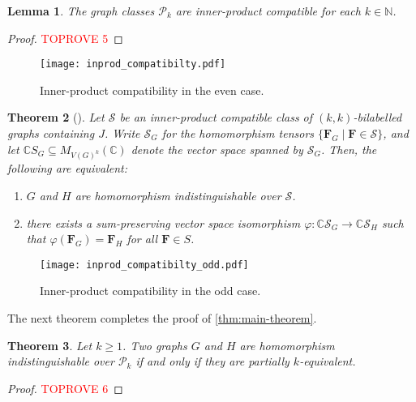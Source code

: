 \documentclass[11pt,a4paper]{article}
\theoremstyle{plain}
\newtheorem{thm}{Theorem}[section]
\newtheorem{lem}[thm]{Lemma}
\theoremstyle{remark}
\theoremstyle{definition}
\def\calP{{\mathcal P}} \def\calQ{{\mathcal Q}} \def\calR{{\mathcal R}}
\def\calS{{\mathcal S}} \def\calT{{\mathcal T}} \def\calU{{\mathcal U}}
\begin{document}
\begin{lem}\label{lem:inn-pro-comp}
    The graph classes $\calP_k$ are inner-product compatible for each $k \in \mathbb{N}$. 
\end{lem}
\begin{proof}\textcolor{red}{TOPROVE 5}\end{proof}

\begin{figure}[t]
  \centering
  \texttt{[image: inprod\_compatibilty.pdf]}
  \caption{Inner-product compatibility in the even case.}
  \label{fig:inprod_compatibilty}
\end{figure}


\begin{thm}[{\cite[Theorem 4.6]{roberson-seppelt-arxiv}}]\label{thm:inn-prod-comp}
    Let $\calS$ be an inner-product compatible class of $(k,k)$-bilabelled graphs containing $J$. Write $\calS_G$ for the homomorphism tensors $\{\boldsymbol{F}_G \mid \boldsymbol{F} \in \mathcal{S}\}$, and let $\mathbb{C}S_G \subseteq M_{V(G)^k}(\mathbb{C})$ denote the vector space spanned by $\calS_G$. Then, the following are equivalent:
    \begin{enumerate}[label = (\roman*)]
        \item $G$ and $H$ are homomorphism indistinguishable over $\calS$. 
        \item there exists a sum-preserving vector space isomorphism $\varphi: \mathbb{C}\calS_G \to \mathbb{C}\calS_H$ such that $\varphi(\boldsymbol{F}_G) = \boldsymbol{F}_H$ for all $\boldsymbol{F} \in S$. 
    \end{enumerate}
\end{thm}


\begin{figure}[t]
  \centering
  \texttt{[image: inprod\_compatibilty\_odd.pdf]}
  \caption{Inner-product compatibility in the odd case.}
  \label{fig:inprod_compatibilty_odd}
\end{figure}

The next theorem completes the proof of \cref{thm:main-theorem}. 

\begin{thm}\label{thm:main-theorem-3}
  Let $k\geq 1$. 
  Two graphs $G$ and $H$ are homomorphism indistinguishable over $\calP_k$ if and only if they are partially $k$-equivalent.
\end{thm}
\begin{proof}\textcolor{red}{TOPROVE 6}\end{proof}
\end{document}
